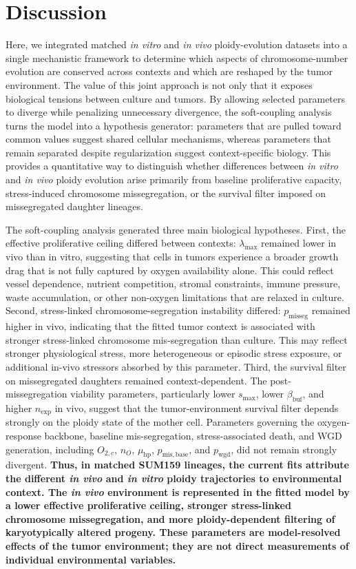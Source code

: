 \documentclass[11pt]{article}
\begin{document}
\clearpage
\section*{Discussion}

Here, we integrated matched \textit{in vitro} and \textit{in vivo} ploidy-evolution datasets into a single mechanistic framework to determine which aspects of chromosome-number evolution are conserved across contexts and which are reshaped by the tumor environment. The value of this joint approach is not only that it exposes biological tensions between culture and tumors. By allowing selected parameters to diverge while penalizing unnecessary divergence, the soft-coupling analysis turns the model into a hypothesis generator: parameters that are pulled toward common values suggest shared cellular mechanisms, whereas parameters that remain separated despite regularization suggest context-specific biology. This provides a quantitative way to distinguish whether differences between \textit{in vitro} and \textit{in vivo} ploidy evolution arise primarily from baseline proliferative capacity, stress-induced chromosome missegregation, or the survival filter imposed on missegregated daughter lineages.

The soft-coupling analysis generated three main biological hypotheses. First, the effective proliferative ceiling differed between contexts: \(\lambda_{\max}\) remained lower in vivo than in vitro, suggesting that cells in tumors experience a broader growth drag that is not fully captured by oxygen availability alone. This could reflect vessel dependence, nutrient competition, stromal constraints, immune pressure, waste accumulation, or other non-oxygen limitations that are relaxed in culture. Second, stress-linked chromosome-segregation instability differed: \(p_{\mathrm{misseg}}\) remained higher in vivo, indicating that the fitted tumor context is associated with stronger stress-linked chromosome mis-segregation than culture. This may reflect stronger physiological stress, more heterogeneous or episodic stress exposure, or additional in-vivo stressors absorbed by this parameter. Third, the survival filter on missegregated daughters remained context-dependent. The post-missegregation viability parameters, particularly lower \(s_{\max}\), lower \(\beta_{\mathrm{buf}}\), and higher \(n_{\mathrm{exp}}\) in vivo, suggest that the tumor-environment survival filter depends strongly on the ploidy state of the mother cell. Parameters governing the oxygen-response backbone, baseline mis-segregation, stress-associated death, and WGD generation, including \(O_{2,c}\), \(n_O\), \(\mu_{\mathrm{hp}}\), \(p_{\mathrm{mis,base}}\), and \(p_{\mathrm{wgd}}\), did not remain strongly divergent. \textbf{Thus, in matched SUM159 lineages, the current fits attribute the different \textit{in vivo} and \textit{in vitro} ploidy trajectories to environmental context. The \textit{in vivo} environment is represented in the fitted model by a lower effective proliferative ceiling, stronger stress-linked chromosome missegregation, and more ploidy-dependent filtering of karyotypically altered progeny. These parameters are model-resolved effects of the tumor environment; they are not direct measurements of individual environmental variables.}
\end{document}

